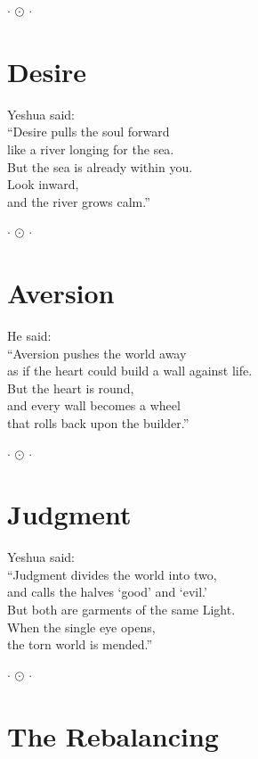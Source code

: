 \documentclass[10pt, openright]{book}
\newcommand{\sectionbreak}{\filbreak}
\newcommand{\ornament}{
    \vspace{1.5cm}
    \begin{center}
        \large \(\cdot\) \(\odot\) \(\cdot\)
    \end{center}
    \vspace{1.5cm}
}
\begin{document}
\ornament

\sectionbreak

\section{Desire}\label{desire}

Yeshua said:\\
``Desire pulls the soul forward\\
like a river longing for the sea.\\
But the sea is already within you.\\
Look inward,\\
and the river grows calm.''

\ornament

\sectionbreak

\section{Aversion}\label{aversion}

He said:\\
``Aversion pushes the world away\\
as if the heart could build a wall against life.\\
But the heart is round,\\
and every wall becomes a wheel\\
that rolls back upon the builder.''

\ornament

\sectionbreak

\section{Judgment}\label{judgment}

Yeshua said:\\
``Judgment divides the world into two,\\
and calls the halves `good' and `evil.'\\
But both are garments of the same Light.\\
When the single eye opens,\\
the torn world is mended.''

\ornament

\sectionbreak

\section{The Rebalancing}\label{the-rebalancing}
\end{document}
